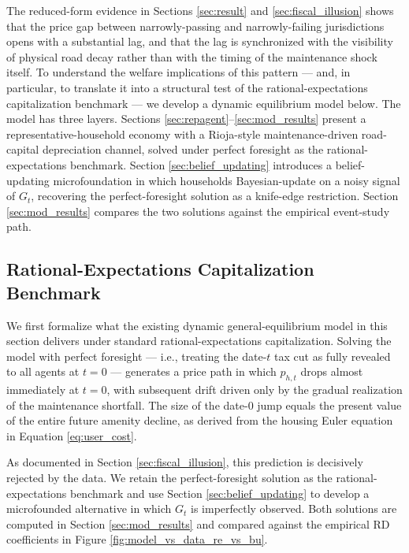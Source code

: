 The reduced-form evidence in Sections \ref{sec:result} and \ref{sec:fiscal_illusion} shows that the price gap between narrowly-passing and narrowly-failing jurisdictions opens with a substantial lag, and that the lag is synchronized with the visibility of physical road decay rather than with the timing of the maintenance shock itself. To understand the welfare implications of this pattern --- and, in particular, to translate it into a structural test of the rational-expectations capitalization benchmark --- we develop a dynamic equilibrium model below. The model has three layers. Sections \ref{sec:repagent}--\ref{sec:mod_results} present a representative-household economy with a Rioja-style maintenance-driven road-capital depreciation channel, solved under perfect foresight as the rational-expectations benchmark. Section \ref{sec:belief_updating} introduces a belief-updating microfoundation in which households Bayesian-update on a noisy signal of $G_t$, recovering the perfect-foresight solution as a knife-edge restriction. Section \ref{sec:mod_results} compares the two solutions against the empirical event-study path.

\subsection{Rational-Expectations Capitalization Benchmark} \label{sec:re_benchmark}

We first formalize what the existing dynamic general-equilibrium model in this section delivers under standard rational-expectations capitalization. Solving the model with perfect foresight --- i.e., treating the date-$t$ tax cut as fully revealed to all agents at $t = 0$ --- generates a price path in which $p_{h,t}$ drops almost immediately at $t = 0$, with subsequent drift driven only by the gradual realization of the maintenance shortfall. The size of the date-$0$ jump equals the present value of the entire future amenity decline, as derived from the housing Euler equation in Equation \ref{eq:user_cost}.

As documented in Section \ref{sec:fiscal_illusion}, this prediction is decisively rejected by the data. We retain the perfect-foresight solution as the rational-expectations benchmark and use Section \ref{sec:belief_updating} to develop a microfounded alternative in which $G_t$ is imperfectly observed. Both solutions are computed in Section \ref{sec:mod_results} and compared against the empirical RD coefficients in Figure \ref{fig:model_vs_data_re_vs_bu}.

